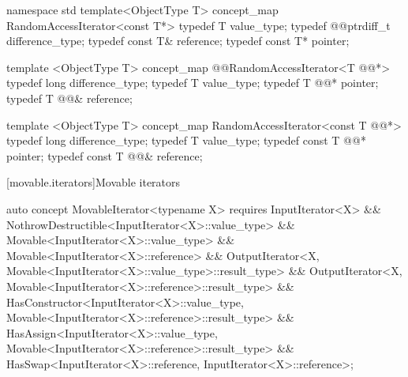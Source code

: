 \documentclass[american,twoside]{book}
\begin{document}
\begin{codeblock}
namespace std {
  template<ObjectType T> concept_map RandomAccessIterator<const T*> {
    typedef T value_type;
    typedef @@ptrdiff_t difference_type;
    typedef const T& reference;
    typedef const T* pointer;
  }
}
\end{codeblock}

\pnum
{}

\color{addclr}
\begin{codeblock}
  template <ObjectType T> concept_map @@RandomAccessIterator<T @@*> {
    typedef long difference_type;
    typedef T value_type;
    typedef T @@* pointer;
    typedef T @@& reference;
  }

  template <ObjectType T> concept_map RandomAccessIterator<const T @@*> {
    typedef long difference_type;
    typedef T value_type;
    typedef const T @@* pointer;
    typedef const T @@& reference;
  }
\end{codeblock}
\textcolor{addclr}{\exitnote}
\color{black}

[movable.iterators]{Movable iterators}
\pnum
{}

\color{ccadd}
\begin{codeblock}
auto concept MovableIterator<typename X> {
  requires InputIterator<X>
        && NothrowDestructible<InputIterator<X>::value_type>
        && Movable<InputIterator<X>::value_type>
        && Movable<InputIterator<X>::reference>
        && OutputIterator<X, Movable<InputIterator<X>::value_type>::result_type>
        && OutputIterator<X, Movable<InputIterator<X>::reference>::result_type>
        && HasConstructor<InputIterator<X>::value_type, 
                          Movable<InputIterator<X>::reference>::result_type>
        && HasAssign<InputIterator<X>::value_type, 
                     Movable<InputIterator<X>::reference>::result_type>
        && HasSwap<InputIterator<X>::reference, InputIterator<X>::reference>;
}
\end{codeblock}
\color{black}
\end{document}
